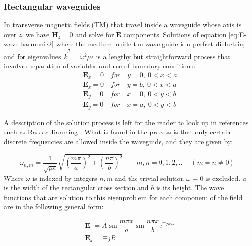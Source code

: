 \subsubsection{Rectangular waveguides} 

In transverse magnetic fields (TM) that travel inside a waveguide whose axis is over $z$, we have $\mathbf{H}_z = 0$ and solve for $\mathbf{E}$ components. 
Solutions of equation \ref{eq:E-wave-harmonic2} where the medium inside the wave guide is a perfect dielectric, and  for eigenvalues $\vec{k}^2 = \omega^2\mu\epsilon$ is a lengthy but straightforward process that involves separation of variables and use of boundary conditions:
\begin{align}
&\mathbf{E}_x = 0 \quad for \quad y=0,\ 0<x<a\\
&\mathbf{E}_x = 0 \quad for \quad y=b,\ 0<x<a\\
&\mathbf{E}_y = 0 \quad for \quad x=0,\ 0<y<b\\
&\mathbf{E}_y = 0 \quad for \quad x=a,\ 0<y<b
\end{align}

A description of the solution process is left for the reader to look up in references such as Rao  \cite{Rao2004} or Jianming \cite{Jin2010}. What is found in the process is that only certain discrete frequencies are allowed inside the waveguide, and they are given by:

\begin{equation}
\omega_{n,m} = \frac{1}{\sqrt{\mu\epsilon}}\sqrt{\left(\frac{m\pi}{a}\right)^2+\left(\frac{n\pi}{b}\right)^2}
\qquad m,n = 0,1,2,... \quad (m=n\neq0)
\label{eq:eig_vals_sqare_waveguide}
\end{equation}
Where $\omega$ is indexed by integers $n,m$ and the trivial solution $\omega = 0$ is excluded. $a$ is the width of the rectangular cross section and $b$ is its height.
The wave functions that are solution to this eigenproblem for each component of the field are in the following general form:

\begin{align}
&\mathbf{E}_z = A\sin{\dfrac{m\pi x}{a}}\sin{\dfrac{n\pi x}{b}}e^{\mp jk_zz}\\
&\mathbf{E}_x =\mp jB
\end{align}



